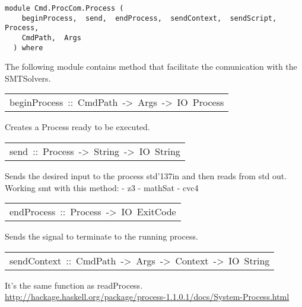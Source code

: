 \label{module:Cmd.ProcCom.Process}
\haddockbeginheader
{\haddockverb\begin{verbatim}
module Cmd.ProcCom.Process (
    beginProcess,  send,  endProcess,  sendContext,  sendScript,  Process, 
    CmdPath,  Args
  ) where\end{verbatim}}
\haddockendheader

The following module contains method that facilitate the comunication with
  the SMTSolvers.
\par

\begin{haddockdesc}
\item[\begin{tabular}{@{}l}
beginProcess\ ::\ CmdPath\ ->\ Args\ ->\ IO\ Process
\end{tabular}]\haddockbegindoc
Creates a Process ready to be executed.
\par

\end{haddockdesc}
\begin{haddockdesc}
\item[\begin{tabular}{@{}l}
send\ ::\ Process\ ->\ String\ ->\ IO\ String
\end{tabular}]\haddockbegindoc
Sends the desired input to the process std{\char '137}in and then reads from std out.
    Working smt with this method:
      - z3
      - mathSat
      - cvc4
\par

\end{haddockdesc}
\begin{haddockdesc}
\item[\begin{tabular}{@{}l}
endProcess\ ::\ Process\ ->\ IO\ ExitCode
\end{tabular}]\haddockbegindoc
Sends the signal to terminate to the running process.
\par

\end{haddockdesc}
\begin{haddockdesc}
\item[\begin{tabular}{@{}l}
sendContext\ ::\ CmdPath\ ->\ Args\ ->\ Context\ ->\ IO\ String
\end{tabular}]\haddockbegindoc
It's the same function as readProcess.
\url{http://hackage.haskell.org/package/process-1.1.0.1/docs/System-Process.html}
\par

\end{haddockdesc}
